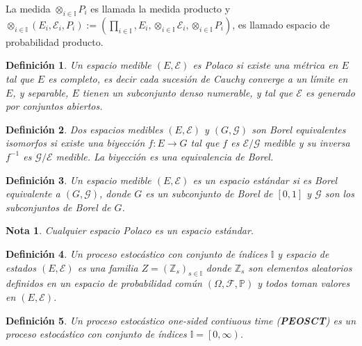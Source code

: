 \documentclass{article}
\newtheorem{Def}{Definición}
\newtheorem{Note}{Nota}
\newcommand{\prob}{\mathbb{P}}
\begin{document}
La medida $\otimes_{i\in\mathbb{I}}P_{i}$ es llamada la medida producto y $\otimes_{i\in\mathbb{I}}\left(E_{i},\mathcal{E}_{i},P_{i}\right):=\left(\prod_{i\in\mathbb{I}},E_{i},\otimes_{i\in\mathbb{I}}\mathcal{E}_{i},\otimes_{i\in\mathbb{I}}P_{i}\right)$, es llamado espacio de probabilidad producto.


\begin{Def}
Un espacio medible $\left(E,\mathcal{E}\right)$ es \textit{Polaco} si existe una m\'etrica en $E$ tal que $E$ es completo, es decir cada sucesi\'on de Cauchy converge a un l\'imite en $E$, y \textit{separable}, $E$ tienen un subconjunto denso numerable, y tal que $\mathcal{E}$ es generado por conjuntos abiertos.
\end{Def}


\begin{Def}
Dos espacios medibles $\left(E,\mathcal{E}\right)$ y $\left(G,\mathcal{G}\right)$ son Borel equivalentes \textit{isomorfos} si existe una biyecci\'on $f:E\rightarrow G$ tal que $f$ es $\mathcal{E}/\mathcal{G}$ medible y su inversa $f^{-1}$ es $\mathcal{G}/\mathcal{E}$ medible. La biyecci\'on es una equivalencia de Borel.
\end{Def}

\begin{Def}
Un espacio medible  $\left(E,\mathcal{E}\right)$ es un \textit{espacio est\'andar} si es Borel equivalente a $\left(G,\mathcal{G}\right)$, donde $G$ es un subconjunto de Borel de $\left[0,1\right]$ y $\mathcal{G}$ son los subconjuntos de Borel de $G$.
\end{Def}

\begin{Note}
Cualquier espacio Polaco es un espacio est\'andar.
\end{Note}


\begin{Def}
Un proceso estoc\'astico con conjunto de \'indices $\mathbb{I}$ y espacio de estados $\left(E,\mathcal{E}\right)$ es una familia $Z=\left(\mathbb{Z}_{s}\right)_{s\in\mathbb{I}}$ donde $\mathbb{Z}_{s}$ son elementos aleatorios definidos en un espacio de probabilidad com\'un $\left(\Omega,\mathcal{F},\prob\right)$ y todos toman valores en $\left(E,\mathcal{E}\right)$.
\end{Def}

\begin{Def}
Un proceso estoc\'astico \textit{one-sided contiuous time} (\textbf{PEOSCT}) es un proceso estoc\'astico con conjunto de \'indices $\mathbb{I}=\left[0,\infty\right)$.
\end{Def}
\end{document}

